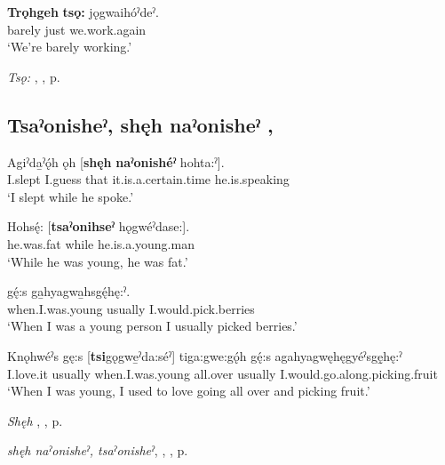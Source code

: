 \ea
\label{ex:tpart110}
\gll \textbf{Trǫhgeh} \textbf{tsǫ:} jǫgwaihóˀdeˀ.\\
barely just we.work.again\\
\glt ‘We’re barely working.’
\z

\begin{CayugaRelated}
\item \textit{Tsǫ:} , , p. \pageref{p:[tsǫ:]}
\end{CayugaRelated}


\subsection*{\textbf{Tsaˀonisheˀ, shęh naˀonisheˀ} , } \label{p:[tsaˀonisheˀ]}

\ea
\label{ex:tpart111}
\gll Agiˀda̱ˀǫ́h ǫh [\textbf{shęh} \textbf{naˀonishéˀ} hohta:ˀ].\\
I.slept I.guess that it.is.a.certain.time he.is.speaking\\
\glt ‘I slept while he spoke.’
\z

\ea
\label{ex:tpart112}
\gll Hohsę́: [\textbf{tsaˀonihseˀ} hǫgwéˀdase:].\\
he.was.fat while he.is.a.young.man\\
\glt ‘While he was young, he was fat.’
\z

\ea
\label{ex:tpart113}
 gę́:s ga̱hyagwa̱hsgę́hę:ˀ.\\
when.I.was.young usually I.would.pick.berries\\
\glt ‘When I was a young person I usually picked berries.’
\z

\ea
\label{ex:tpart114}
\gll Knǫhwéˀs gę:s [\textbf{tsi}gǫgwe̱ˀda:séˀ] tiga:gwe:gǫ́h gę́:s agahyagwęhęgyéˀsgę̱hę:ˀ\\
I.love.it usually when.I.was.young all.over usually I.would.go.along.picking.fruit\\
\glt ‘When I was young, I used to love going all over and picking fruit.’
\z

\begin{CayugaRelated}
\item \textit{Shęh} , , p. \pageref{p:[shęh] `that’}\\
\item \textit{shęh naˀonisheˀ, tsaˀonisheˀ},  , , p. \pageref{p:[shęh naˀonisheˀ]}
\end{CayugaRelated}


